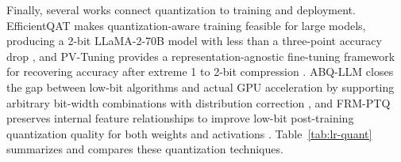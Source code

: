 \documentclass[
11pt, %
english, %
singlespacing, %
headsepline, %
]{MastersDoctoralThesis} %
\begin{document}
Finally, several works connect quantization to training and deployment. EfficientQAT makes quantization-aware training feasible for large models, producing a 2-bit LLaMA-2-70B model with less than a three-point accuracy drop \cite{chen2025efficientqat}, and PV-Tuning provides a representation-agnostic fine-tuning framework for recovering accuracy after extreme 1 to 2-bit compression \cite{malinovskii2024pvtuning}. ABQ-LLM closes the gap between low-bit algorithms and actual GPU acceleration by supporting arbitrary bit-width combinations with distribution correction \cite{zeng2025abqllm}, and FRM-PTQ preserves internal feature relationships to improve low-bit post-training quantization quality for both weights and activations \cite{survey2026frmptq}. Table~\ref{tab:lr-quant} summarizes and compares these quantization techniques.
\end{document}
